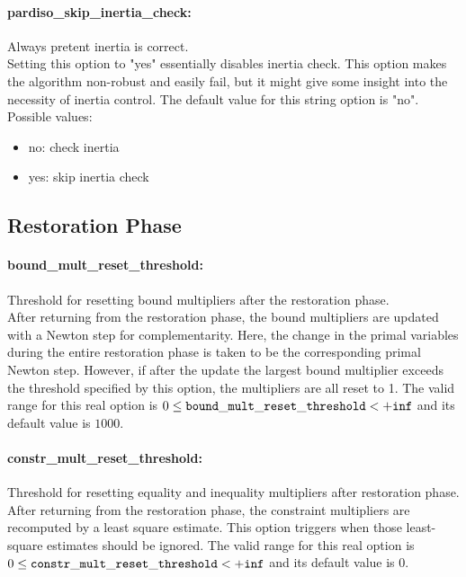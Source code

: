 \paragraph{pardiso\_skip\_inertia\_check:}\label{sec:pardiso_skip_inertia_check} Always pretent inertia is correct. $\;$ \\
 Setting this option to "yes" essentially disables
inertia check. This option makes the algorithm
non-robust and easily fail, but it might give
some insight into the necessity of inertia
control.
The default value for this string option is "no".
\\ 
Possible values:
\begin{itemize}
   \item no: check inertia
   \item yes: skip inertia check
\end{itemize}

\subsection{Restoration Phase}
\label{sec:Restoration_Phase}
\paragraph{bound\_mult\_reset\_threshold:}\label{sec:bound_mult_reset_threshold} Threshold for resetting bound multipliers after the restoration phase. $\;$ \\
 After returning from the restoration phase, the
bound multipliers are updated with a Newton step
for complementarity.  Here, the change in the
primal variables during the entire restoration
phase is taken to be the corresponding primal
Newton step. However, if after the update the
largest bound multiplier exceeds the threshold
specified by this option, the multipliers are all
reset to 1. The valid range for this real option is 
$0 \le {\tt bound\_mult\_reset\_threshold } <  {\tt +inf}$
and its default value is $1000$.


\paragraph{constr\_mult\_reset\_threshold:}\label{sec:constr_mult_reset_threshold} Threshold for resetting equality and inequality multipliers after restoration phase. $\;$ \\
 After returning from the restoration phase, the
constraint multipliers are recomputed by a least
square estimate.  This option triggers when those
least-square estimates should be ignored. The valid range for this real option is 
$0 \le {\tt constr\_mult\_reset\_threshold } <  {\tt +inf}$
and its default value is $0$.


